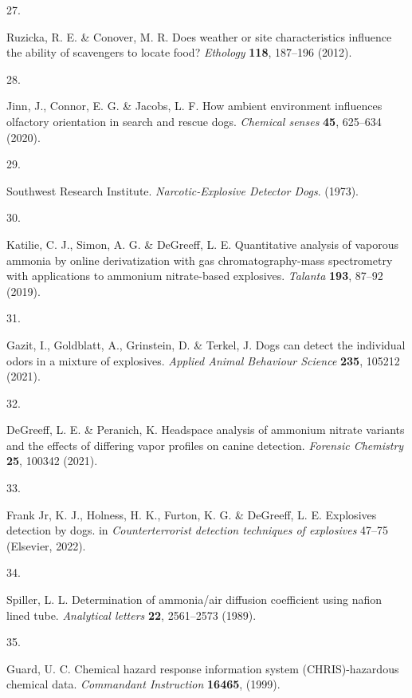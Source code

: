 \documentclass[
]{article}
\newlength{\cslhangindent}
\newlength{\csllabelwidth}
\newlength{\cslentryspacingunit} %
\newenvironment{CSLReferences}[2] %
 {%
  \setlength{\parindent}{0pt}
  \ifodd #1
  \let\oldpar\par
  \def\par{\hangindent=\cslhangindent\oldpar}
  \fi
  \setlength{\parskip}{#2\cslentryspacingunit}
 }%
 {}
\newcommand{\CSLLeftMargin}[1]{\parbox[t]{\csllabelwidth}{#1}}
\newcommand{\CSLRightInline}[1]{\parbox[t]{\linewidth - \csllabelwidth}{#1}\break}
\begin{document}
\begin{CSLReferences}{0}{0}
\leavevmode{}%
\CSLLeftMargin{27. }%
\CSLRightInline{Ruzicka, R. E. \& Conover, M. R. Does weather or site characteristics influence the ability of scavengers to locate food? \emph{Ethology} \textbf{118}, 187--196 (2012).}

\leavevmode{}%
\CSLLeftMargin{28. }%
\CSLRightInline{Jinn, J., Connor, E. G. \& Jacobs, L. F. How ambient environment influences olfactory orientation in search and rescue dogs. \emph{Chemical senses} \textbf{45}, 625--634 (2020).}

\leavevmode{}%
\CSLLeftMargin{29. }%
\CSLRightInline{Southwest Research Institute. \emph{Narcotic-Explosive Detector Dogs}. (1973).}

\leavevmode{}%
\CSLLeftMargin{30. }%
\CSLRightInline{Katilie, C. J., Simon, A. G. \& DeGreeff, L. E. Quantitative analysis of vaporous ammonia by online derivatization with gas chromatography-mass spectrometry with applications to ammonium nitrate-based explosives. \emph{Talanta} \textbf{193}, 87--92 (2019).}

\leavevmode{}%
\CSLLeftMargin{31. }%
\CSLRightInline{Gazit, I., Goldblatt, A., Grinstein, D. \& Terkel, J. Dogs can detect the individual odors in a mixture of explosives. \emph{Applied Animal Behaviour Science} \textbf{235}, 105212 (2021).}

\leavevmode{}%
\CSLLeftMargin{32. }%
\CSLRightInline{DeGreeff, L. E. \& Peranich, K. Headspace analysis of ammonium nitrate variants and the effects of differing vapor profiles on canine detection. \emph{Forensic Chemistry} \textbf{25}, 100342 (2021).}

\leavevmode{}%
\CSLLeftMargin{33. }%
\CSLRightInline{Frank Jr, K. J., Holness, H. K., Furton, K. G. \& DeGreeff, L. E. Explosives detection by dogs. in \emph{Counterterrorist detection techniques of explosives} 47--75 (Elsevier, 2022).}

\leavevmode{}%
\CSLLeftMargin{34. }%
\CSLRightInline{Spiller, L. L. Determination of ammonia/air diffusion coefficient using nafion lined tube. \emph{Analytical letters} \textbf{22}, 2561--2573 (1989).}

\leavevmode{}%
\CSLLeftMargin{35. }%
\CSLRightInline{Guard, U. C. Chemical hazard response information system (CHRIS)-hazardous chemical data. \emph{Commandant Instruction} \textbf{16465}, (1999).}


\end{CSLReferences}
\end{document}

